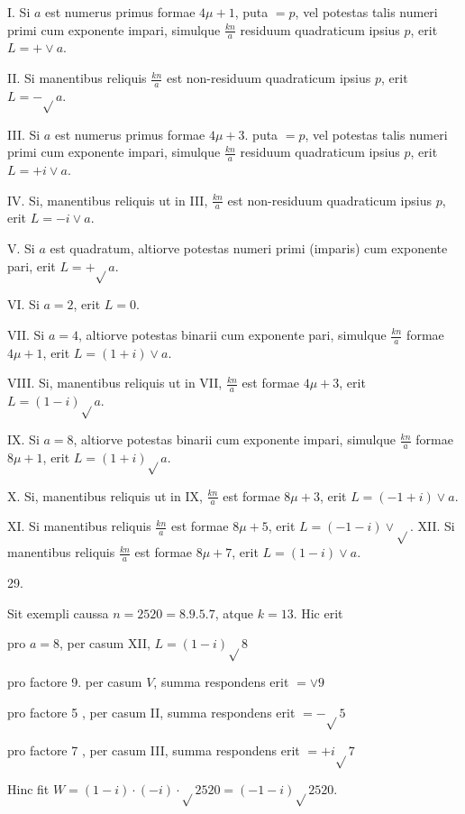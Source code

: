 \documentclass[10pt]{article}
\begin{document}
I. Si \(a\) est numerus primus formae \(4 \mu+1\), puta \(=p\), vel potestas talis numeri primi cum exponente impari, simulque \(\frac{k n}{a}\) residuum quadraticum ipsius \(p\), erit \(L=+\vee a\).

II. Si manentibus reliquis \(\frac{k n}{a}\) est non-residuum quadraticum ipsius \(p\), erit \(L=-\sqrt{ } a\).

III. Si \(a\) est numerus primus formae \(4 \mu+3\). puta \(=p\), vel potestas talis numeri primi cum exponente impari, simulque \(\frac{k n}{a}\) residuum quadraticum ipsius \(p\), erit \(L=+i \vee a\).

IV. Si, manentibus reliquis ut in III, \(\frac{k n}{a}\) est non-residuum quadraticum ipsius \(p\), erit \(L=-i \vee a\).

V. Si \(a\) est quadratum, altiorve potestas numeri primi (imparis) cum exponente pari, erit \(L=+\sqrt{ } a\).

VI. Si \(a=2\), erit \(L=0\).

VII. Si \(a=4\), altiorve potestas binarii cum exponente pari, simulque \(\frac{k n}{a}\) formae \(4 \mu+1\), erit \(L=(1+i) \vee a\).

VIII. Si, manentibus reliquis ut in VII, \(\frac{k n}{a}\) est formae \(4 \mu+3\), erit \(L=(1-i) \sqrt{ } a\).

IX. Si \(a=8\), altiorve potestas binarii cum exponente impari, simulque \(\frac{k n}{a}\) formae \(8 \mu+1\), erit \(L=(1+i) \sqrt{ } a\).

X. Si, manentibus reliquis ut in IX, \(\frac{k n}{a}\) est formae \(8 \mu+3\), erit \(L=(-1+i) \vee a\).

XI. Si manentibus reliquis \(\frac{k n}{a}\) est formae \(8 \mu+5\), erit \(L=(-1-i) \vee \sqrt{ }\). XII. Si manentibus reliquis \(\frac{k n}{a}\) est formae \(8 \mu+7\), erit \(L=(1-i) \vee a\).

29.

Sit exempli caussa \(n=2520=8.9 .5 .7\), atque \(k=13\). Hic erit

pro \(a=8\), per casum XII, \(L=(1-i) \sqrt{ } 8\)

pro factore 9. per casum \(V\), summa respondens erit \(=\vee 9\)

pro factore 5 , per casum II, summa respondens erit \(=-\sqrt{ } 5\)

pro factore 7 , per casum III, summa respondens erit \(=+i \sqrt{ } 7\)

Hinc fit \(W=(1-i) \cdot(-i) \cdot \sqrt{ } 2520=(-1-i) \sqrt{ } 2520\).
\end{document}
